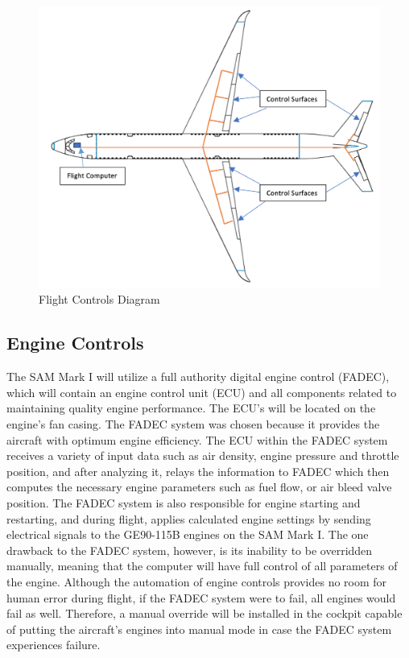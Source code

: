 \begin{figure}[H]
    \centering
    \includegraphics[width=.75\linewidth]{Photos/systems/flight_controls.png}
    \caption{Flight Controls Diagram}
    \label{flighte_controls}
\end{figure}

\subsection{Engine Controls}
The SAM Mark I will utilize a full authority digital engine control (FADEC), which will contain an engine control unit (ECU) and all components related to maintaining quality engine performance. The ECU's will be located on the engine's fan casing. The FADEC system was chosen because it provides the aircraft with optimum engine efficiency. The ECU within the FADEC system receives a variety of input data such as air density, engine pressure and throttle position, and after analyzing it, relays the information to FADEC which then computes the necessary engine parameters such as fuel flow, or air bleed valve position. The FADEC system is also responsible for engine starting and restarting, and during flight, applies calculated engine settings by sending electrical signals to the GE90-115B engines on the SAM Mark I. The one drawback to the FADEC system, however, is its inability to be overridden manually, meaning that the computer will have full control of all parameters of the engine. Although the automation of engine controls provides no room for human error during flight, if the FADEC system were to fail, all engines would fail as well. Therefore, a manual override will be installed in the cockpit capable of putting the aircraft's engines into manual mode in case the FADEC system experiences failure.  

